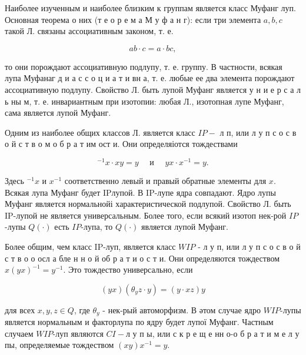 \documentclass[10pt]{article}
\begin{document}
Наиболее изученным и наиболее близким к группам является класс Муфанг луп. Основная теорема о них (т е о р е м а М у ф а н г): если три элемента $a, b, c$ такой Л. связаны ассоциативным законом, т. е.



\[

a b \cdot c=a \cdot b c,

\]



то они порождают ассоциативную подлупу, т. е. группу. В частности, всякая лупа Муфанаг д и а с с о ц и а т и вн а, т. е. любые ее два элемента порождают ассоциативную подлупу. Свойство Л. быть лупой Муфанг является у н и е р с а л ь ны м, т. е. инвариантным при изотопии: любая Л., изотопная лупе Муфанг, сама является лупой Муфанг.



Одним из наиболее общих классов Л. является класс $I P-$ л п, или л у п с о с в о й с т в о м о б р а т им ост и. Они определяіотся тождествами



\[

{ }^{-1} x \cdot x y=y \quad \text { и } \quad y x \cdot x^{-1}=y .

\]



Здесь ${ }^{-1} x$ и $x^{-1}$ соответственно левый и правый обратные элементы для $x$. Всякая лупа Муфанг будет IPлупой. В IP-лупе ядра совпадают. Ядро лупы Муфанг является нормальнойі характеристической подлупой. Свойство Л. быть IP-лупой не является универсальным. Более того, если всякий изотоп нек-рой $I P$-лупы $Q(\cdot)$ есть $I P$-лупа, то $Q(\cdot)$ является лупой Муфанг.



Более общим, чем класс IP-луп, является класс $W I P$ - л у п, или л у п с о с в о й с т в о о осл а бле н н о й об р а т и о с т и. Они определяются тождеством $x(y x)^{-1}=y^{-1}$. Это тождество универсально, если



\[

(y x)\left(\theta_{y} z \cdot y\right)=(y \cdot x z) y

\]



для всех $x, y, z \in Q$, где $\theta_{y}$ - нек-рый автоморфизм. В әтом случае ядро $W I P$-лупы является нормальным и факторлупа по ядру будет лупої Муфанг. Частным случаем $W I P$-луп являются $C I-л$ у п ы, или с к р е щ е нн о-о б р а т и м е л у пы, определяемые тождеством $(x y) x^{-1}=y$.
\end{document}
